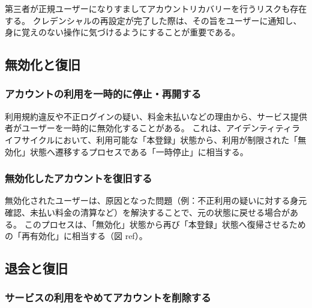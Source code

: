 \documentclass[uplatex]{jsarticle}
\def\ref#1{ref}%
\def\label#1{}%
\begin{document}
\begin{rem}[クレデンシャル再設定の通知]\label{rem:ch3-recovery-notification}
第三者が正規ユーザーになりすましてアカウントリカバリーを行うリスクも存在する。
クレデンシャルの再設定が完了した際は、その旨をユーザーに通知し、身に覚えのない操作に気づけるようにすることが重要である。
\end{rem}

\subsection{無効化と復旧}

\subsubsection{アカウントの利用を一時的に停止・再開する}

利用規約違反や不正ログインの疑い、料金未払いなどの理由から、サービス提供者がユーザーを一時的に無効化することがある。
これは、アイデンティティライフサイクルにおいて、利用可能な「本登録」状態から、利用が制限された「無効化」状態へ遷移するプロセスである「一時停止」に相当する。

\subsubsection{無効化したアカウントを復旧する}

無効化されたユーザーは、原因となった問題（例：不正利用の疑いに対する身元確認、未払い料金の清算など）を解決することで、元の状態に戻せる場合がある。
このプロセスは、「無効化」状態から再び「本登録」状態へ復帰させるための「再有効化」に相当する（図 \ref{fig:ch3-lifecycle}）。

\subsection{退会と復旧}

\subsubsection{サービスの利用をやめてアカウントを削除する}
\end{document}
